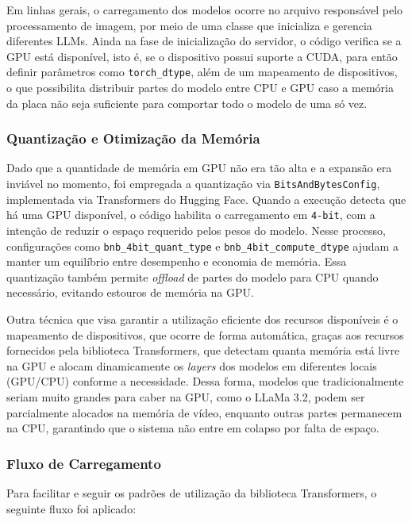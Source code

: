 Em linhas gerais, o carregamento dos modelos ocorre no arquivo responsável pelo processamento de imagem, por meio de uma classe que inicializa e gerencia diferentes LLMs. Ainda na fase de inicialização do servidor, o código verifica se a GPU está disponível, isto é, se o dispositivo possui suporte a CUDA, para então definir parâmetros como \texttt{torch\_dtype}, além de um mapeamento de dispositivos, o que possibilita distribuir partes do modelo entre CPU e GPU caso a memória da placa não seja suficiente para comportar todo o modelo de uma só vez.

\subsubsection{Quantização e Otimização da Memória}

Dado que a quantidade de memória em GPU não era tão alta e a expansão era inviável no momento, foi empregada a quantização via \texttt{BitsAndBytesConfig}, implementada via Transformers do Hugging Face. Quando a execução detecta que há uma GPU disponível, o código habilita o carregamento em \texttt{4-bit}, com a intenção de reduzir o espaço requerido pelos pesos do modelo. Nesse processo, configurações como \texttt{bnb\_4bit\_quant\_type} e \texttt{bnb\_4bit\_compute\_dtype} ajudam a manter um equilíbrio entre desempenho e economia de memória. Essa quantização também permite \textit{offload} de partes do modelo para CPU quando necessário, evitando estouros de memória na GPU.

Outra técnica que visa garantir a utilização eficiente dos recursos disponíveis é o mapeamento de dispositivos, que ocorre de forma automática, graças aos recursos fornecidos pela biblioteca Transformers, que detectam quanta memória está livre na GPU e alocam dinamicamente os \textit{layers} dos modelos em diferentes locais (GPU/CPU) conforme a necessidade. Dessa forma, modelos que tradicionalmente seriam muito grandes para caber na GPU, como o LLaMa 3.2, podem ser parcialmente alocados na memória de vídeo, enquanto outras partes permanecem na CPU, garantindo que o sistema não entre em colapso por falta de espaço.

\subsubsection{Fluxo de Carregamento}

Para facilitar e seguir os padrões de utilização da biblioteca Transformers, o seguinte fluxo foi aplicado:

